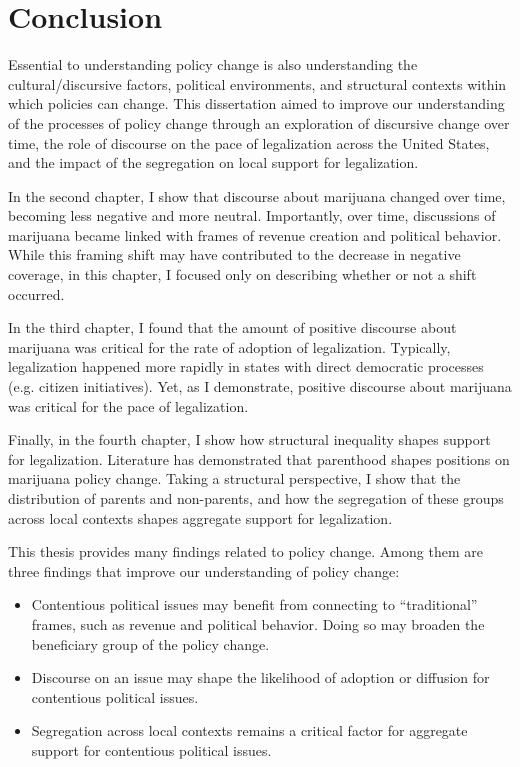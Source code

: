 \chapter{Conclusion}
 
 Essential to understanding policy change is also understanding the cultural/discursive factors, political environments, and structural contexts within which policies can change.  This dissertation aimed to improve our understanding of the processes of policy change through an exploration of discursive change over time, the role of discourse on the pace of legalization across the United States, and the impact of the segregation on local support for legalization. 
 
 In the second chapter, I show that discourse about marijuana changed over time, becoming less negative and more neutral. Importantly, over time, discussions of marijuana became linked with frames of revenue creation and political behavior. While this framing shift may have contributed to the decrease in negative coverage, in this chapter, I focused only on describing whether or not a shift occurred. 
 
 In the third chapter, I found that the amount of positive discourse about marijuana was critical for the rate of adoption of legalization. Typically, legalization happened more rapidly in states with direct democratic processes (e.g. citizen initiatives). Yet, as I demonstrate, positive discourse about marijuana was critical for the pace of legalization.
 
 Finally, in the fourth chapter, I show how structural inequality shapes support for legalization. Literature has demonstrated that parenthood shapes positions on marijuana policy change. Taking a structural perspective, I show that the distribution of parents and non-parents, and how the segregation of these groups across local contexts shapes aggregate support for legalization. 
 
 This thesis provides many findings related to policy change. Among them are three findings that improve our understanding of policy change:
 
 \begin{itemize}
 \item Contentious political issues may benefit from connecting to ``traditional'' frames, such as revenue and political behavior. Doing so may broaden the beneficiary group of the policy change. 
 \item Discourse on an issue may shape the likelihood of adoption or diffusion for contentious political issues. 
 \item Segregation across local contexts remains a critical factor for aggregate support for contentious political issues. 
 \end{itemize}
 

